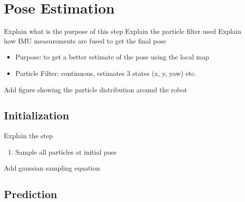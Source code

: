 


\section{Pose Estimation} \label{pose_estimation}

Explain what is the purpose of this step
Explain the particle filter used
Explain how IMU measurements are fused to get the final pose

\begin{itemize}
    \item Purpose: to get a better estimate of the pose using the local map
    \item Particle Filter: continuous, estimates 3 states (x, y, yaw) etc.
\end{itemize}

\noindent
Add figure showing the particle distribution around the robot

\subsection{Initialization}

Explain the step

\begin{enumerate}
    \item Sample all particles at initial pose
\end{enumerate}

\noindent
Add gaussian sampling equation

\subsection{Prediction}

